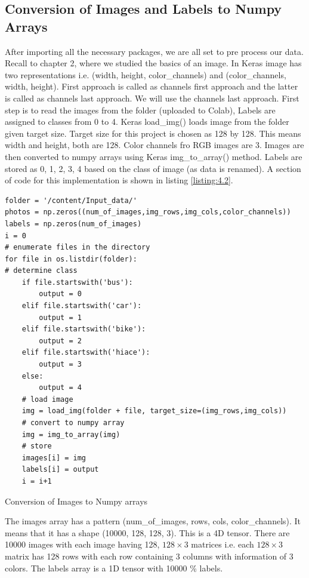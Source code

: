 \subsection{Conversion of Images and Labels to Numpy Arrays}
After importing all the necessary packages, we are all set to pre process our data.
Recall to chapter 2, where we studied the basics of an image. In Keras image has two
representations i.e. (width, height, color\_channels) and (color\_channels, width, height).
First approach is called as channels first approach and the latter is called as
channels last approach. We will use the channels last approach.
First step is to read the images from the folder (uploaded to Colab),
Labels are assigned to classes from 0 to 4. Keras load\_img() loads image from the folder given
target size. Target size for this project is chosen as 128 by 128. This means width and height,
both are 128. Color channels fro RGB images are 3. Images are then converted to numpy arrays using
Keras img\_to\_array() method. Labels are stored as 0, 1, 2, 3, 4 based on the class of image (as data is renamed).
A section of code for this implementation is shown in listing \ref{listing:4.2}.

\begin{listing}[H]
    \begin{verbatim}
folder = '/content/Input_data/'
photos = np.zeros((num_of_images,img_rows,img_cols,color_channels))
labels = np.zeros(num_of_images)
i = 0
# enumerate files in the directory
for file in os.listdir(folder):
# determine class
    if file.startswith('bus'):
        output = 0
    elif file.startswith('car'):
        output = 1
    elif file.startswith('bike'):
        output = 2
    elif file.startswith('hiace'):
        output = 3
    else:
        output = 4
    # load image
    img = load_img(folder + file, target_size=(img_rows,img_cols))
    # convert to numpy array
    img = img_to_array(img)
    # store
    images[i] = img
    labels[i] = output
    i = i+1
\end{verbatim}
\caption{Conversion of Images to Numpy arrays}
\label{listing:4.2}
\end{listing}
The images array has a pattern (num\_of\_images, rows, cols, color\_channels). It
means that it has a shape (10000, 128, 128, 3). This is a 4D tensor. There are 10000
images with each image having 128, $128\times 3$ matrices i.e. each $128\times 3$ matrix has
128 rows with each row containing 3 columns with information of 3 colors.
The labels array is a 1D tensor with 10000 \% labels.
